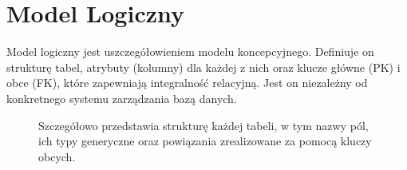\documentclass[a4paper,11pt,polish]{sphinxmanual}
\begin{document}
\section{Model Logiczny}
\label{\detokenize{rozdzial_3:model-logiczny}}
\sphinxAtStartPar
Model logiczny jest uszczegółowieniem modelu koncepcyjnego. Definiuje on strukturę tabel, atrybuty (kolumny) dla każdej z nich oraz klucze główne (PK) i obce (FK), które zapewniają integralność relacyjną. Jest on niezależny od konkretnego systemu zarządzania bazą danych.

\begin{figure}[htbp]
\centering
\capstart

\noindent{}
\caption{ Szczegółowo przedstawia strukturę każdej tabeli, w tym nazwy pól, ich typy generyczne oraz powiązania zrealizowane za pomocą kluczy obcych.}\label{\detokenize{rozdzial_3:id2}}\end{figure}
\end{document}
